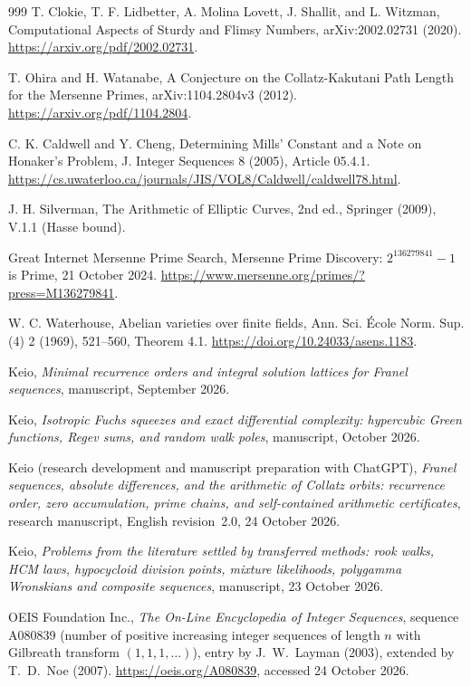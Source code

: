 \documentclass[11pt,a4paper]{article}
\theoremstyle{definition}
\theoremstyle{remark}
\numberwithin{equation}{section}
\begin{document}
\begin{thebibliography}{999}
T. Clokie, T. F. Lidbetter, A. Molina Lovett, J. Shallit, and L. Witzman, Computational Aspects of Sturdy and Flimsy Numbers, arXiv:2002.02731 (2020). \url{https://arxiv.org/pdf/2002.02731}.

T. Ohira and H. Watanabe, A Conjecture on the Collatz-Kakutani Path Length for the Mersenne Primes, arXiv:1104.2804v3 (2012). \url{https://arxiv.org/pdf/1104.2804}.

C. K. Caldwell and Y. Cheng, Determining Mills' Constant and a Note on Honaker's Problem, J. Integer Sequences 8 (2005), Article 05.4.1. \url{https://cs.uwaterloo.ca/journals/JIS/VOL8/Caldwell/caldwell78.html}.

J. H. Silverman, The Arithmetic of Elliptic Curves, 2nd ed., Springer (2009), V.1.1 (Hasse bound).

Great Internet Mersenne Prime Search, Mersenne Prime Discovery: $2^{136279841}-1$ is Prime, 21 October 2024. \url{https://www.mersenne.org/primes/?press=M136279841}.

W. C. Waterhouse, Abelian varieties over finite fields, Ann. Sci. \'Ecole Norm. Sup. (4) 2 (1969), 521--560, Theorem 4.1. \url{https://doi.org/10.24033/asens.1183}.

Keio, \emph{Minimal recurrence orders and integral solution lattices for Franel sequences}, manuscript, September 2026.

Keio, \emph{Isotropic Fuchs squeezes and exact differential complexity: hypercubic Green functions, Regev sums, and random walk poles}, manuscript, October 2026.

Keio (research development and manuscript preparation with ChatGPT), \emph{Franel sequences, absolute differences, and the arithmetic of Collatz orbits: recurrence order, zero accumulation, prime chains, and self-contained arithmetic certificates}, research manuscript, English revision~2.0, 24 October 2026.

Keio, \emph{Problems from the literature settled by transferred methods: rook walks, HCM laws, hypocycloid division points, mixture likelihoods, polygamma Wronskians and composite sequences}, manuscript, 23 October 2026.

OEIS Foundation Inc., \emph{The On-Line Encyclopedia of Integer Sequences}, sequence A080839
(number of positive increasing integer sequences of length $n$ with Gilbreath transform
$(1,1,1,\dots)$), entry by J.~W.~Layman (2003), extended by T.~D.~Noe (2007).
\url{https://oeis.org/A080839}, accessed 24 October 2026.


\end{thebibliography}
\end{document}
